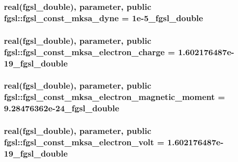 \subsubsection[{fgsl\+\_\+const\+\_\+mksa\+\_\+dyne}]{\setlength{\rightskip}{0pt plus 5cm}real({\bf fgsl\+\_\+double}), parameter, public fgsl\+::fgsl\+\_\+const\+\_\+mksa\+\_\+dyne = 1e-\/5\+\_\+fgsl\+\_\+double}\label{namespacefgsl_a17365a3e64a2dd83aea9ebba6757fd7b}
\hypertarget{namespacefgsl_a5e5f274ebbe5764c7828f792b8b10b12}{}
\subsubsection[{fgsl\+\_\+const\+\_\+mksa\+\_\+electron\+\_\+charge}]{\setlength{\rightskip}{0pt plus 5cm}real({\bf fgsl\+\_\+double}), parameter, public fgsl\+::fgsl\+\_\+const\+\_\+mksa\+\_\+electron\+\_\+charge = 1.\+602176487e-\/19\+\_\+fgsl\+\_\+double}\label{namespacefgsl_a5e5f274ebbe5764c7828f792b8b10b12}
\hypertarget{namespacefgsl_ae360dd0b55b309065855f8521a316e0f}{}
\subsubsection[{fgsl\+\_\+const\+\_\+mksa\+\_\+electron\+\_\+magnetic\+\_\+moment}]{\setlength{\rightskip}{0pt plus 5cm}real({\bf fgsl\+\_\+double}), parameter, public fgsl\+::fgsl\+\_\+const\+\_\+mksa\+\_\+electron\+\_\+magnetic\+\_\+moment = 9.\+28476362e-\/24\+\_\+fgsl\+\_\+double}\label{namespacefgsl_ae360dd0b55b309065855f8521a316e0f}
\hypertarget{namespacefgsl_a2b715db04903e667b5f50d6df3054bee}{}
\subsubsection[{fgsl\+\_\+const\+\_\+mksa\+\_\+electron\+\_\+volt}]{\setlength{\rightskip}{0pt plus 5cm}real({\bf fgsl\+\_\+double}), parameter, public fgsl\+::fgsl\+\_\+const\+\_\+mksa\+\_\+electron\+\_\+volt = 1.\+602176487e-\/19\+\_\+fgsl\+\_\+double}\label{namespacefgsl_a2b715db04903e667b5f50d6df3054bee}
\hypertarget{namespacefgsl_a7135370afba011fa6c30a3028af76f15}{}
